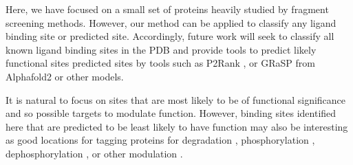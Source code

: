 Here, we have focused on a small set of proteins heavily studied by fragment screening methods. However, our method can be applied to classify any ligand binding site or predicted site. Accordingly, future work will seek to classify all known ligand binding sites in the PDB and provide tools to predict likely functional sites predicted sites by tools such as P2Rank \cite{KRIVAK_2018_P2RANK}, or GRaSP \cite{SANTANA_2020_GRaSP, SANTANA_2022_GRaSP} from Alphafold2 \cite{JUMPER_2021_ALPHAFOLD, VARADI_2022_ALPHAFOLDDB} or other models.

It is natural to focus on sites that are most likely to be of functional significance and so possible targets to modulate function. However, binding sites identified here that are predicted to be least likely to have function may also be interesting as good locations for tagging proteins for degradation \cite{BEKES_2022_PROTACS}, phosphorylation \cite{SIRIWARDENA_2020_PHOSPHO}, dephosphorylation \cite{SIMPSON_2023_ADPROM}, or other modulation \cite{HEITEL_2023_PTMS, PENG_2023_PTMS}.